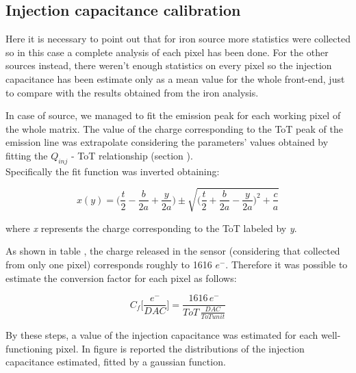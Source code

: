 

\subsection{Injection capacitance calibration}

Here it is necessary to point out that for iron source more statistics were collected so in this case a complete analysis of each pixel has been done. For the other sources instead, there weren't enough statistics on every pixel so the injection capacitance has been estimate only as a mean value for the whole front-end, just to compare with the results obtained from the iron analysis.  

In case of  source, we managed to fit the emission peak for each working pixel of the whole matrix. The value of the charge corresponding to the ToT peak of the emission line was extrapolate considering the parameters' values obtained by fitting the $Q_{inj}$ - ToT relationship (section ). \\

Specifically the fit function  was inverted obtaining:

\begin{equation}
x(y) = \bigg(\frac{t}{2} - \frac{b}{2a} + \frac{y}{2a}\bigg) \pm \sqrt{\bigg(\frac{t}{2} + \frac{b}{2a} - \frac{y}{2a}\bigg)^{2} + \frac{c}{a}}
\end{equation}

where \textit{x} represents the charge corresponding to the ToT labeled by \textit{y}.

As shown in table , the charge released in the sensor (considering that collected from only one pixel) corresponds roughly to 1616 $e^{-}$. Therefore it was possible to estimate the conversion factor for each pixel as follows:

\begin{equation}
C_{f}\bigg[\frac{e^{-}}{DAC}\bigg] = \frac{1616 \, e^{-}}{ToT \, \frac{DAC}{ToT unit}}
\label{inj_cap}
\end{equation} 

By these steps, a value of the injection capacitance was estimated for each well-functioning pixel. In figure  is reported the distributions of the injection capacitance estimated, fitted by a gaussian function.

